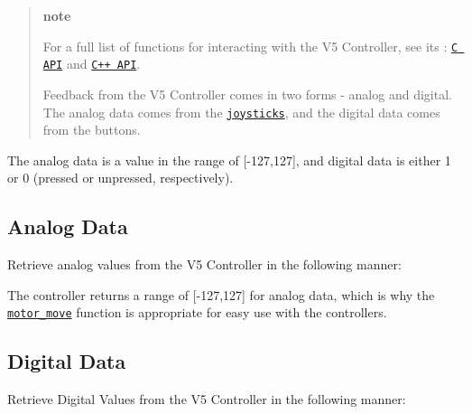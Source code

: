\begin{quote}
{\bfseries note}

For a full list of functions for interacting with the V5 Controller, see its \+: \href{../../api/c/misc.html}{\tt C A\+PI} and \href{../../api/cpp/misc.html}{\tt C++ A\+PI}.

Feedback from the V5 Controller comes in two forms -\/ analog and digital. The analog data comes from the \href{https://en.wikipedia.org/wiki/Analog_stick}{\tt joysticks}, and the digital data comes from the buttons. \end{quote}


The analog data is a value in the range of \mbox{[}-\/127,127\mbox{]}, and digital data is either 1 or 0 (pressed or unpressed, respectively).

\subsection*{Analog Data}

Retrieve analog values from the V5 Controller in the following manner\+:

The controller returns a range of \mbox{[}-\/127,127\mbox{]} for analog data, which is why the \href{../../api/c/motors.html#motor-move}{\tt motor\+\_\+move} function is appropriate for easy use with the controllers.

\subsection*{Digital Data}

Retrieve Digital Values from the V5 Controller in the following manner\+: 